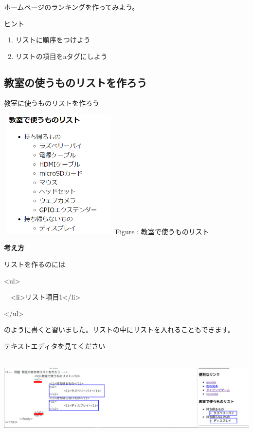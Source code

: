 \documentclass[a4paper,12pt]{jarticle}
\begin{document}
ホームページのランキングを作ってみよう。

ヒント

\begin{enumerate}
  \item リストに順序をつけよう
  \item リストの項目をaタグにしよう
\end{enumerate}

\clearpage
{}
\subsection{\theExercise 教室の使うものリストを作ろう}
教室に使うものリストを作ろう

\bigskip
\centering
\begin{minipage}{5.937cm}
  {\upshape
    \includegraphics[width=5.937cm,height=6.498cm]{textbook-img203.png}
    \newline
    Figure : 教室で使うものリスト}
\end{minipage}

\bigskip
\flushleft

\textbf{考え方}



リストを作るのには

{\textless}ul{\textgreater}

\ \ {\textless}li{\textgreater}リスト項目1{\textless}/li{\textgreater}

{\textless}/ul{\textgreater}

のように書くと習いました。リストの中にリストを入れることもできます。

テキストエディタを見てください

\bigskip

\centering
\includegraphics[width=15.519cm,height=4.383cm]{textbook-img204.png}
\end{document}
